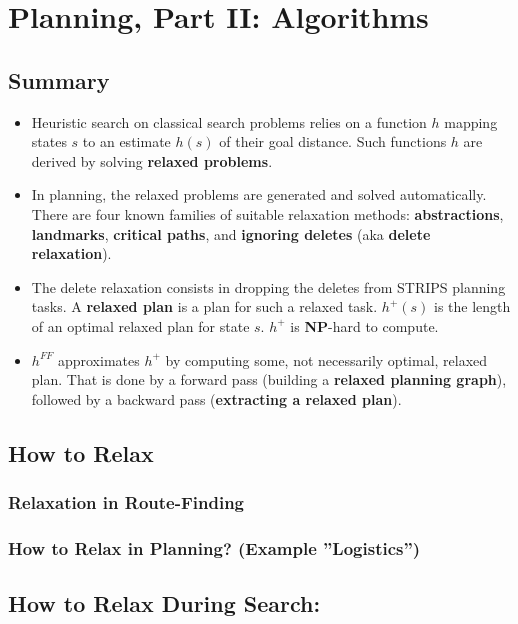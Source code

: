 \documentclass[conference, a4paper]{styles/acmsiggraph}
\begin{document}
\section{Planning, Part II: Algorithms}
    \subsection{Summary}
        \begin{itemize}
            \item Heuristic search on classical search problems relies on a function $h$ mapping states $s$ to an estimate $h(s)$ of their goal distance. 
            Such functions $h$ are derived by solving \textbf{relaxed problems}.
            \item In planning, the relaxed problems are generated and solved automatically.
            There are four known families of suitable relaxation methods: 
            \textbf{abstractions}, \textbf{landmarks}, \textbf{critical paths}, and \textbf{ignoring deletes} (aka \textbf{delete relaxation}).
            \item The delete relaxation consists in dropping the deletes from STRIPS planning tasks. 
            A \textbf{relaxed plan} is a plan for such a relaxed task. 
            $h^+(s)$ is the length of an optimal relaxed plan for state $s$. 
            $h^+$ is \textbf{NP}-hard to compute.
            \item $h^{FF}$ approximates $h^+$ by computing some, not necessarily optimal, relaxed plan. 
            That is done by a forward pass (building a \textbf{relaxed planning graph}), followed by a backward pass (\textbf{extracting a relaxed plan}).
        \end{itemize}
    
    \subsection{How to Relax}
        \subsubsection{Relaxation in Route-Finding}
        \subsubsection{How to Relax in Planning? (Example ''Logistics'')}
    \subsection{How to Relax During Search:}
\end{document}
